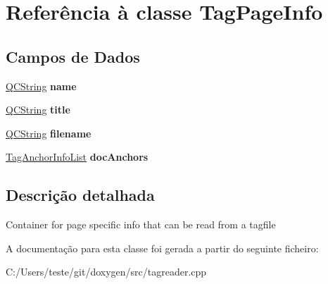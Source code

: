 \hypertarget{class_tag_page_info}{\section{Referência à classe Tag\-Page\-Info}
\label{class_tag_page_info}
}
\subsection*{Campos de Dados}
\begin{DoxyCompactItemize}
\item 
\hypertarget{class_tag_page_info_adc0097c7bd1e61ad32058fcde425bc7a}{\hyperlink{class_q_c_string}{Q\-C\-String} {\bfseries name}}\label{class_tag_page_info_adc0097c7bd1e61ad32058fcde425bc7a}

\item 
\hypertarget{class_tag_page_info_a42bb80709d086df855babb087e63794b}{\hyperlink{class_q_c_string}{Q\-C\-String} {\bfseries title}}\label{class_tag_page_info_a42bb80709d086df855babb087e63794b}

\item 
\hypertarget{class_tag_page_info_a99a47216e8094a3186f3d837ee0b1c25}{\hyperlink{class_q_c_string}{Q\-C\-String} {\bfseries filename}}\label{class_tag_page_info_a99a47216e8094a3186f3d837ee0b1c25}

\item 
\hypertarget{class_tag_page_info_a3a6c53fe1869a01e3748ec5898a54458}{\hyperlink{class_tag_anchor_info_list}{Tag\-Anchor\-Info\-List} {\bfseries doc\-Anchors}}\label{class_tag_page_info_a3a6c53fe1869a01e3748ec5898a54458}

\end{DoxyCompactItemize}


\subsection{Descrição detalhada}
Container for page specific info that can be read from a tagfile 

A documentação para esta classe foi gerada a partir do seguinte ficheiro\-:\begin{DoxyCompactItemize}
\item 
C\-:/\-Users/teste/git/doxygen/src/tagreader.\-cpp\end{DoxyCompactItemize}

